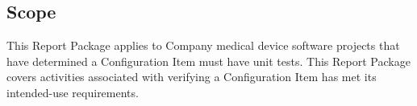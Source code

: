 \subsection{Scope}
This Report Package applies to Company medical device software projects that
have determined a Configuration Item must have unit tests.  This Report Package
covers activities associated with verifying a Configuration Item has met its
intended-use requirements.
